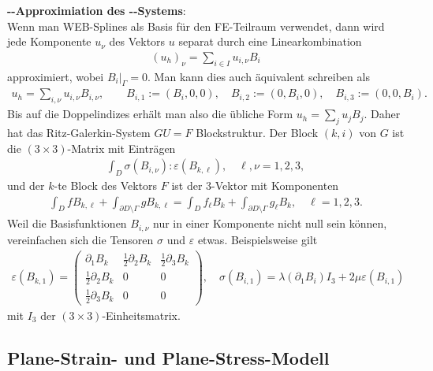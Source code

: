 \textbf{--Approximiation des --Systems}:\\
Wenn man WEB-Splines als Basis für den FE-Teilraum verwendet, dann wird jede Komponente $u_\nu$
des Vektors $u$ separat durch eine Linearkombination
\begin{align*}
    (u_h)_\nu = \sum_{i \in I} u_{i,\nu} B_i
\end{align*}
approximiert, wobei $B_i|_\Gamma = 0$.
Man kann dies auch äquivalent schreiben als
\begin{align*}
    u_h = \sum_{i,\nu} u_{i,\nu} B_{i,\nu},\qquad
    B_{i,1} := (B_i, 0, 0),\quad
    B_{i,2} := (0, B_i, 0),\quad
    B_{i,3} := (0, 0, B_i).
\end{align*}
Bis auf die Doppelindizes erhält man also die übliche Form $u_h = \sum_j u_j B_j$.
Daher hat das Ritz-Galerkin-System $GU = F$ Blockstruktur.
Der Block $(k, i)$ von $G$ ist die $(3 \times 3)$-Matrix mit Einträgen
\begin{align*}
    \int_D \sigma(B_{i,\nu}):\varepsilon(B_{k,\ell}),\quad
    \ell, \nu = 1, 2, 3,
\end{align*}
und der $k$-te Block des Vektors $F$ ist der $3$-Vektor mit Komponenten
\begin{align*}
    \int_D f B_{k,\ell} + \int_{\partial D \setminus \Gamma} g B_{k,\ell}
    = \int_D f_\ell B_k + \int_{\partial D \setminus \Gamma} g_\ell B_k,\quad
    \ell = 1, 2, 3.
\end{align*}
Weil die Basisfunktionen $B_{i,\nu}$ nur in einer Komponente nicht null sein können,
vereinfachen sich die Tensoren $\sigma$ und $\varepsilon$ etwas.
Beispielsweise gilt
\begin{align*}
    \varepsilon(B_{k,1})
    = \begin{pmatrix}\partial_1 B_k & \frac{1}{2} \partial_2 B_k & \frac{1}{2} \partial_3 B_k\\
    \frac{1}{2} \partial_2 B_k & 0 & 0\\
    \frac{1}{2} \partial_3 B_k & 0 & 0\end{pmatrix},\quad
    \sigma(B_{i,1}) = \lambda (\partial_1 B_i) I_3 + 2\mu \varepsilon(B_{i,1})
\end{align*}
mit $I_3$ der $(3 \times 3)$-Einheitsmatrix.

\pagebreak

\subsection{%
    Plane-Strain- und Plane-Stress-Modell%
}

